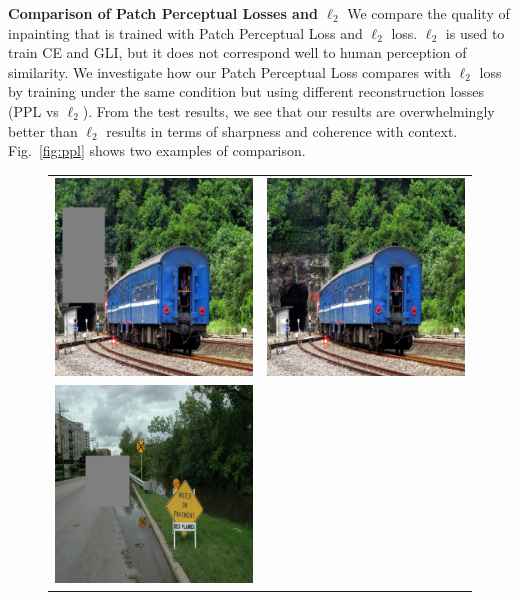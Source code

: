 \noindent\textbf{Comparison of Patch Perceptual Losses and $\ell_2$} We compare the quality of inpainting that is trained with Patch Perceptual Loss and $\ell_2$ loss. $\ell_2$ is used to train CE and GLI, but it does not correspond well to human perception of similarity. We investigate how our Patch Perceptual Loss compares with $\ell_2$ loss by training under the same condition but using different reconstruction losses (PPL vs $\ell_2$). From the test results, we see that our results are overwhelmingly better than $\ell_2$ results in terms of sharpness and coherence with context. Fig.~\ref{fig:ppl} shows two examples of comparison. 

\begin{figure}[h!]  
\centering  
\small  
\setlength\tabcolsep{2pt}
\begin{tabular}{cc} 
\includegraphics[width=.45\textwidth]{figures/random_512/test_latest/images/000000565778_input_image.jpg}&
\includegraphics[width=.45\textwidth]{figures/random_512/test_latest/images/000000565778_synthesized_image.jpg}\\ 
\includegraphics[width=.45\textwidth]{figures/random_512/test_latest/images/000000344611_input_image.jpg}&

\end{tabular}
\end{figure}
